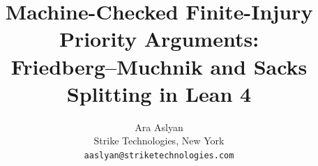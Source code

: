 \documentclass[11pt]{article}
\title{Machine-Checked Finite-Injury Priority Arguments:\\
Friedberg--Muchnik and Sacks Splitting in Lean 4}
\author{%
  Ara Aslyan\\
  Strike Technologies, New York\\
  \texttt{aaslyan@striketechnologies.com}
}
\date{}
\begin{document}
\maketitle

\begin{abstract}

\end{abstract}








\appendix



\end{document}
